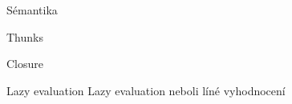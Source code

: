 \chap Sémantika


\sec Thunks


\sec Closure

\sec Lazy evaluation 
Lazy evaluation neboli líné vyhodnocení
